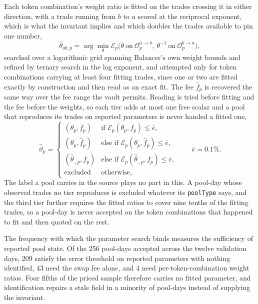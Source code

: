 Each token combination's weight ratio is fitted on the trades crossing it in either direction, with a trade running from $b$ to $a$ scored at the reciprocal exponent, which is what the invariant implies and which doubles the trades available to pin one number,
\[
\widehat\theta_{ab,p}=\arg\min_{\theta}
\mathcal{E}_p\bigl(\theta\ \text{on}\ \mathcal{O}^{a\to b}_p,\ \theta^{-1}\ \text{on}\ \mathcal{O}^{b\to a}_p\bigr),
\]
searched over a logarithmic grid spanning Balancer's own weight bounds and refined by ternary search in the log exponent, and attempted only for token combinations carrying at least four fitting trades, since one or two are fitted exactly by construction and then read as an exact fit. The fee $\widehat f_p$ is recovered the same way over the fee range the vault permits. Reading is tried before fitting and the fee before the weights, so each tier adds at most one free scalar and a pool that reproduces its trades on reported parameters is never handed a fitted one,
\begin{equation}
\label{eq:weighted-fit}
\widehat\vartheta_p=
\begin{cases}
(\theta_p,f_p) & \text{if } \mathcal{E}_p(\theta_p,f_p)\le\bar e,\\
(\theta_p,\widehat f_p) & \text{else if } \mathcal{E}_p(\theta_p,\widehat f_p)\le\bar e,\\
(\widehat\theta_{\cdot,p},f_p) & \text{else if } \mathcal{E}_p(\widehat\theta_{\cdot,p},f_p)\le\bar e,\\
\text{excluded} & \text{otherwise,}
\end{cases}
\qquad\bar e=0.1\%.
\end{equation}
The label a pool carries in the source plays no part in this. A pool-day whose observed trades no tier reproduces is excluded whatever its \texttt{poolType} says, and the third tier further requires the fitted ratios to cover nine tenths of the fitting trades, so a pool-day is never accepted on the token combinations that happened to fit and then quoted on the rest.

The frequency with which the parameter search binds measures the sufficiency of reported pool state. Of the 256 pool-days accepted across the twelve validation days, 209 satisfy the error threshold on reported parameters with nothing identified, 43 need the swap fee alone, and 4 need per-token-combination weight ratios. Four fifths of the priced sample therefore carries no fitted parameter, and identification repairs a stale field in a minority of pool-days instead of supplying the invariant.

